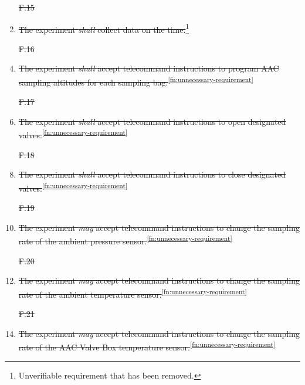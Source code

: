\documentclass[a4paper,12pt,twoside]{article}
\providecommand{\DIFdeltex}[1]{{\protect\color{red}\sout{#1}}}                      %
\providecommand{\DIFaddbegin}{} %
\providecommand{\DIFaddend}{} %
\providecommand{\DIFdelbegin}{} %
\providecommand{\DIFdelend}{} %
\providecommand{\DIFdel}[1]{\texorpdfstring{\DIFdeltex{#1}}{}} %
\newcommand{\DIFscaledelfig}{0.5}
\newlength{\DIFdelgraphicswidth} %
\newlength{\DIFdelgraphicsheight} %
\newcommand{\DIFaddincludegraphics}[2][]{{\color{blue}\fbox{\DIFOincludegraphics[#1]{#2}}}} %
\newcommand{\DIFdelincludegraphics}[2][]{%
\sbox{\DIFdelgraphicsbox}{\DIFOincludegraphics[#1]{#2}}%
\settoboxwidth{\DIFdelgraphicswidth}{\DIFdelgraphicsbox} %
\settoboxtotalheight{\DIFdelgraphicsheight}{\DIFdelgraphicsbox} %
\scalebox{\DIFscaledelfig}{%
\parbox[b]{\DIFdelgraphicswidth}{\usebox{\DIFdelgraphicsbox}\\[-\baselineskip] \rule{\DIFdelgraphicswidth}{0em}}\llap{\resizebox{\DIFdelgraphicswidth}{\DIFdelgraphicsheight}{%
\setlength{\unitlength}{\DIFdelgraphicswidth}%
\begin{picture}(1,1)%
\thicklines\linethickness{2pt} %
{\color[rgb]{1,0,0}\put(0,0){\framebox(1,1){}}}%
{\color[rgb]{1,0,0}\put(0,0){\line( 1,1){1}}}%
{\color[rgb]{1,0,0}\put(0,1){\line(1,-1){1}}}%
\end{picture}%
}\hspace*{3pt}}} %
} %
\DeclareRobustCommand{\DIFaddbegin}{\DIFOaddbegin \let\includegraphics\DIFaddincludegraphics} %
\DeclareRobustCommand{\DIFaddend}{\DIFOaddend \let\includegraphics\DIFOincludegraphics} %
\DeclareRobustCommand{\DIFdelbegin}{\DIFOdelbegin \let\includegraphics\DIFdelincludegraphics} %
\DeclareRobustCommand{\DIFdelend}{\DIFOaddend \let\includegraphics\DIFOincludegraphics} %
\begin{document}
\begin{enumerate}[label=F.\arabic*]
    \DIFdelbegin %
\item[\DIFdel{F.15}]%
\DIFdelend \DIFaddbegin \item \DIFaddend \st{The experiment \textit{shall} collect data on the time.}\footnote{Unverifiable requirement that has been removed.\label{fn:unverifiable-requirement}}
    \DIFdelbegin %
\item[\DIFdel{F.16}]%
\DIFdelend \DIFaddbegin \item \DIFaddend \st{The experiment \textit{shall} accept telecommand instructions to program AAC sampling altitudes for each sampling bag.}\textsuperscript{\ref{fn:unnecessary-requirement}}
    \DIFdelbegin %
\item[\DIFdel{F.17}]%
\DIFdelend \DIFaddbegin \item \DIFaddend \st{The experiment \textit{shall} accept telecommand instructions to open designated valves.}\textsuperscript{\ref{fn:unnecessary-requirement}}
    \DIFdelbegin %
\item[\DIFdel{F.18}]%
\DIFdelend \DIFaddbegin \item \DIFaddend \st{The experiment \textit{shall} accept telecommand instructions to close designated valves.}\textsuperscript{\ref{fn:unnecessary-requirement}}
    \DIFdelbegin %
\item[\DIFdel{F.19}]%
\DIFdelend \DIFaddbegin \item \DIFaddend \st{The experiment \textit{may} accept telecommand instructions to change the sampling rate of the ambient pressure sensor.}\textsuperscript{\ref{fn:unnecessary-requirement}}
    \DIFdelbegin %
\item[\DIFdel{F.20}]%
\DIFdelend \DIFaddbegin \item \DIFaddend \st{The experiment \textit{may} accept telecommand instructions to change the sampling rate of the ambient temperature sensor.}\textsuperscript{\ref{fn:unnecessary-requirement}}
    \DIFdelbegin %
\item[\DIFdel{F.21}]%
\DIFdelend \DIFaddbegin \item \DIFaddend \st{The experiment \textit{may} accept telecommand instructions to change the sampling rate of the AAC Valve Box temperature sensor.}\textsuperscript{\ref{fn:unnecessary-requirement}}

\end{enumerate}
\end{document}
